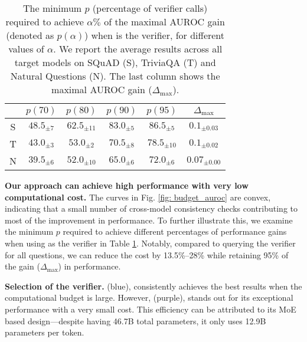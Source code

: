 \begin{table}[!t]
    \centering
    \caption{ The minimum \( p \) (percentage of verifier calls) required to achieve $\alpha\%$ of the maximal AUROC gain (denoted as \( p(\alpha) \)) when \llamathreeseventy{} is the verifier, for different values of \( \alpha \). We report the average results across all target models on SQuAD (S), TriviaQA (T) and Natural Questions (N). The last column shows the maximal AUROC gain ($\Delta_{\text{max}}$).}
    \label{tab: min_p}
    \vspace{-.2cm}
    \begin{tabular}{|c|c|c|c|c|c|}
    \hline
         & $p(70)$ & $p(80)$ & $p(90)$ & $p(95)$ & $\Delta_{\text{max}}$ \\
         \hline
        S & $48.5_{\pm 7}$ & $62.5_{\pm 11}$ & $83.0_{\pm 5}$ & $86.5_{\pm 5}$ & $0.1_{\pm 0.03}$ \\
        \hline
        T & $43.0_{\pm 3}$ & $53.0_{\pm 2}$ & $70.5_{\pm 8}$ & $78.5_{\pm 10}$ & $0.1_{\pm 0.02}$ \\
        \hline
        N & $39.5_{\pm 6}$ & $52.0_{\pm 10}$ & $65.0_{\pm 6}$ & $72.0_{\pm 6}$ & $0.07_{\pm 0.00}$ \\
        \hline
    \end{tabular}
    \vspace{-.4cm}
\end{table}

\textbf{Our approach can achieve high performance with very low computational cost.} The curves in Fig. \ref{fig: budget_auroc} are convex, indicating that a small number of cross-model consistency checks contributing to most of the improvement in performance. To further illustrate this, we examine the minimum \( p \) required to achieve different percentages of performance gains when using \llamathreeseventy{} as the verifier in Table \ref{tab: min_p}. Notably, compared to querying the verifier for all questions, we can reduce the cost by 13.5\%–28\% while retaining 95\% of the gain ($\Delta_{\max}$) in performance. 

\textbf{Selection of the verifier.} \llamathreeseventy{} (blue), consistently achieves the best results when the computational budget is large. However, \mixtral{} (purple), stands out for its exceptional performance with a very small cost. This efficiency can be attributed to its MoE based design—despite having 46.7B total parameters, it only uses 12.9B parameters per token.%


